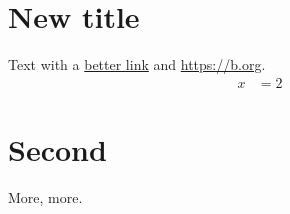 \documentclass{article}
\begin{document}
\section{New title}
Text with a \href{https://example.com}{better link} and \url{https://b.org}.
\begin{align*}
  x &= 2
\end{align*}
\section{Second}
More, more.
\end{document}
